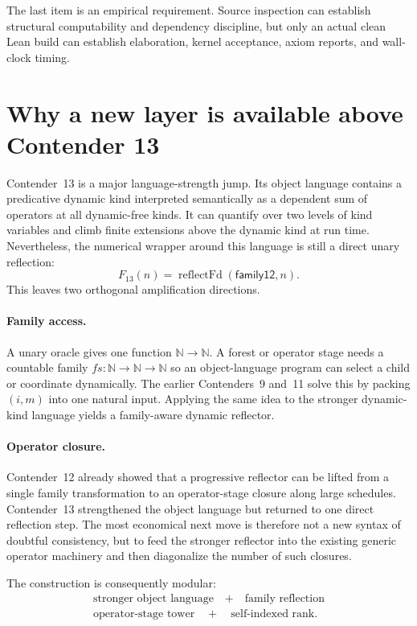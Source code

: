 \documentclass[11pt]{article}
\theoremstyle{definition}
\theoremstyle{remark}
\newcommand{\N}{\mathbb{N}}
\begin{document}
The last item is an empirical requirement.  Source inspection can establish
structural computability and dependency discipline, but only an actual clean
Lean build can establish elaboration, kernel acceptance, axiom reports, and
wall-clock timing.

\section{Why a new layer is available above Contender 13}

Contender~13 is a major language-strength jump.  Its object language contains a
predicative dynamic kind interpreted semantically as a dependent sum of
operators at all dynamic-free kinds.  It can quantify over two levels of kind
variables and climb finite extensions above the dynamic kind at run time.
Nevertheless, the numerical wrapper around this language is still a direct
unary reflection:
\[
F_{13}(n)=\operatorname{reflectFd}(\mathsf{family12},n).
\]
This leaves two orthogonal amplification directions.

\paragraph{Family access.}
A unary oracle gives one function $\N\to\N$.  A forest or operator stage needs a
countable family $fs:\N\to\N\to\N$ so an object-language program can select a
child or coordinate dynamically.  The earlier Contenders~9 and~11 solve this
by packing $(i,m)$ into one natural input.  Applying the same idea to the
stronger dynamic-kind language yields a family-aware dynamic reflector.

\paragraph{Operator closure.}
Contender~12 already showed that a progressive reflector can be lifted from a
single family transformation to an operator-stage closure along large
schedules.  Contender~13 strengthened the object language but returned to one
direct reflection step.  The most economical next move is therefore not a new
syntax of doubtful consistency, but to feed the stronger reflector into the
existing generic operator machinery and then diagonalize the number of such
closures.

The construction is consequently modular:
\[
\begin{gathered}
\boxed{\text{stronger object language}}
\quad+\quad
\boxed{\text{family reflection}}\\[0.5em]
\boxed{\text{operator-stage tower}}
\quad+\quad
\boxed{\text{self-indexed rank}}.
\end{gathered}
\]
\end{document}
